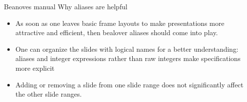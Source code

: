 \documentclass{beamer}
\begin{document}
%
\begin{frame}
{Beanoves manual}
{\large Why aliases are helpful}
\begin{itemize}
\item
As soon as one leaves basic frame layouts to make presentations more attractive and efficient, then bealover aliases should come into play.
\item
One can organize the slides with logical names for a better understanding: aliases and integer expressions rather than raw integers make specifications more explicit
\item
Adding or removing a slide from one slide range does not significantly affect the other slide ranges.
\end{itemize}
\end{frame}
%
\end{document}
